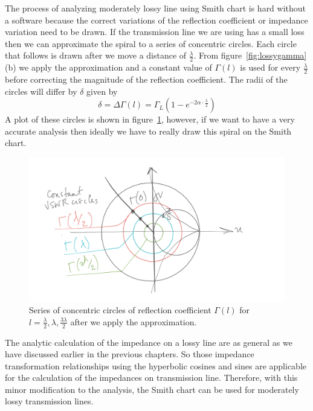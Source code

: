The process of analyzing moderately lossy line using Smith chart is hard without a software because the correct variations of the reflection coefficient or impedance variation need to be drawn. If the transmission line we are using has a small loss then we can approximate the spiral to a series of concentric circles. Each circle that follows is drawn after we move a distance of $\frac{\lambda}{2}$. From figure~\ref{fig:lossygamma}(b) we apply the approximation and a constant value of $\Gamma{(l)}$ is used for every $\frac{\lambda}{2}$ before correcting the magnitude of the reflection coefficient. The radii of the circles will differ by $\delta$ given by
\begin{dmath*}
\delta = \Delta \Gamma{(l)} = \Gamma_L(1 - e^{-2\alpha\cdot \frac{\lambda}{2}})
\end{dmath*}
A plot of these circles is shown in figure~\ref{fig:vswrlossy}, however, if we want to have a very accurate analysis then ideally we have to really draw this spiral on the Smith chart.
\begin{figure}[h]
\centering
\includegraphics[width=1\linewidth]{"./graphics/vswr_lossy_temp"}
\caption{Series of concentric circles of reflection coefficient $\Gamma{(l)}$ for $l = \frac{\lambda}{2},\lambda, \frac{3\lambda}{2}$ after we apply the approximation.}
\label{fig:vswrlossy}
\end{figure}

The analytic calculation of the impedance on a lossy line are as general as we have discussed earlier in the previous chapters. So those impedance transformation relationships using the hyperbolic cosines and sines are applicable for the calculation of the impedances on transmission line. Therefore, with this minor modification to the analysis, the Smith chart can be used for moderately lossy transmission lines.

